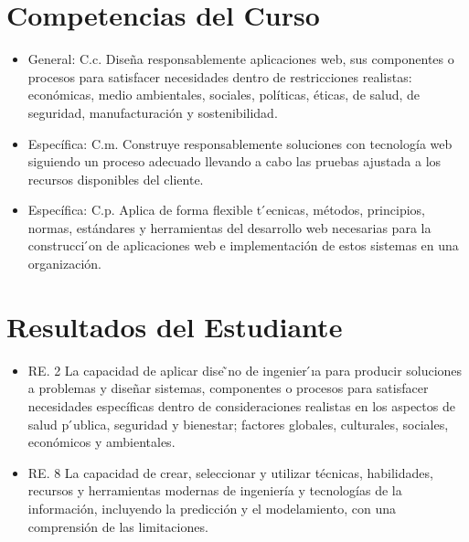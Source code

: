 \documentclass{article}
\begin{document}
	\section{Competencias del Curso}
	\begin{itemize}		
 \item General: C.c. Diseña responsablemente aplicaciones web, sus componentes o procesos para satisfacer necesidades dentro de restricciones realistas: económicas, medio ambientales, sociales, políticas, éticas, de salud, de seguridad, manufacturación y sostenibilidad.

\item Específica: C.m. Construye responsablemente soluciones con tecnología web siguiendo un proceso adecuado llevando a cabo las pruebas ajustada a los recursos disponibles del cliente.

 \item Específica: C.p. Aplica de forma flexible t ́ecnicas, métodos, principios, normas, estándares y herramientas del desarrollo web necesarias para la construcci ́on de aplicaciones web e implementación de estos sistemas en una organización.

	\end{itemize}		
 
	\section{Resultados del Estudiante}
	\begin{itemize}		
 \item RE. 2 La capacidad de aplicar dise ̃no de ingenier ́ıa para producir soluciones a problemas y diseñar sistemas, componentes o procesos para satisfacer necesidades específicas dentro de consideraciones realistas en los aspectos de salud p ́ublica, seguridad y bienestar; factores globales, culturales, sociales, económicos y ambientales.

\item RE. 8 La capacidad de crear, seleccionar y utilizar técnicas, habilidades, recursos y herramientas modernas de ingeniería y tecnologías de la información, incluyendo la predicción y el modelamiento, con una comprensión de las limitaciones.
	\end{itemize}
\end{document}
